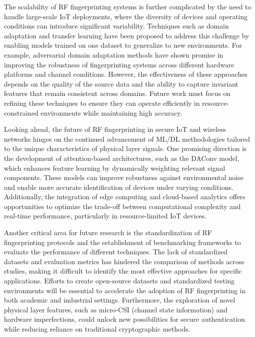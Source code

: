 \documentclass[conference]{IEEEtran}
\begin{document}
The scalability of RF fingerprinting systems is further complicated by the need to handle large-scale IoT deployments, where the diversity of devices and operating conditions can introduce significant variability. Techniques such as domain adaptation and transfer learning have been proposed to address this challenge by enabling models trained on one dataset to generalize to new environments. For example, adversarial domain adaptation methods have shown promise in improving the robustness of fingerprinting systems across different hardware platforms and channel conditions. However, the effectiveness of these approaches depends on the quality of the source data and the ability to capture invariant features that remain consistent across domains. Future work must focus on refining these techniques to ensure they can operate efficiently in resource-constrained environments while maintaining high accuracy.  

Looking ahead, the future of RF fingerprinting in secure IoT and wireless networks hinges on the continued advancement of ML/DL methodologies tailored to the unique characteristics of physical layer signals. One promising direction is the development of attention-based architectures, such as the DAConv model, which enhances feature learning by dynamically weighting relevant signal components. These models can improve robustness against environmental noise and enable more accurate identification of devices under varying conditions. Additionally, the integration of edge computing and cloud-based analytics offers opportunities to optimize the trade-off between computational complexity and real-time performance, particularly in resource-limited IoT devices.  

Another critical area for future research is the standardization of RF fingerprinting protocols and the establishment of benchmarking frameworks to evaluate the performance of different techniques. The lack of standardized datasets and evaluation metrics has hindered the comparison of methods across studies, making it difficult to identify the most effective approaches for specific applications. Efforts to create open-source datasets and standardized testing environments will be essential to accelerate the adoption of RF fingerprinting in both academic and industrial settings. Furthermore, the exploration of novel physical layer features, such as micro-CSI (channel state information) and hardware imperfections, could unlock new possibilities for secure authentication while reducing reliance on traditional cryptographic methods.  
\end{document}
